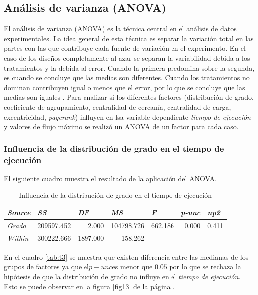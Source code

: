 \documentclass{article}
\begin{document}
\subsection{Análisis de varianza (ANOVA)}
El análisis de varianza (ANOVA) es la técnica central en el análisis de datos experimentales. La idea general de esta técnica es separar la variación total en las partes con las que contribuye cada fuente de variación en el experimento. En el caso de los diseños completamente al azar se separan la variabilidad debida a los tratamientos y la debida al error. Cuando la primera predomina sobre la segunda, es cuando se concluye que las medias son diferentes. Cuando los tratamientos no dominan contribuyen igual o menos que el error, por lo que se concluye que las medias son iguales \cite{ade}.
%
Para analizar si los diferentes factores (distribución de grado, coeficiente de agrupamiento, centralidad de cercanía, centralidad de carga, excentricidad, \textit{pagerank}) influyen en lsa variable dependiente \textit{tiempo de ejecución} y valores de flujo máximo se realizó un ANOVA de un factor para cada caso. 

\subsubsection{Influencia de la distribución de grado en el tiempo de ejecución}
El siguiente cuadro muestra el resultado de la aplicación del ANOVA.
\begin{table}[htbp]
  \centering
  \caption{Influencia de la distribución de grado en el tiempo de ejecución}
    \begin{tabular}{lrrrlll}
    \toprule
    \textit{\textbf{Source}} & \multicolumn{1}{l}{\textit{\textbf{SS}}} & \multicolumn{1}{l}{\textit{\textbf{DF}}} & \multicolumn{1}{l}{\textit{\textbf{MS}}} & \textit{\textbf{F}} & \textit{\textbf{p-unc}} & \textit{\textbf{np2}} \\
    \midrule
    \textit{Grado} & 209597.452 & 2.000 & 104798.726 & \multicolumn{1}{r}{662.186} & \multicolumn{1}{r}{0.000} & \multicolumn{1}{r}{0.411} \\
    \textit{Within} & 300222.666 & 1897.000 & 158.262 & -     & -     & - \\
    \bottomrule
    \end{tabular}%
  \label{tab:tab3}%
\end{table}%

En el cuadro \ref{tab:t3} se muestra que existen diferencia entre las medianas de los grupos de factores ya que el\textbf{$p-unc$}es menor que $0.05$ por lo que se rechaza la hipótesis de que la distribución de grado no influye en el \textit{tiempo de ejecución}. Esto se puede observar en la figura \ref{fig13} de la página \pageref{fig13}. 
\end{document}
